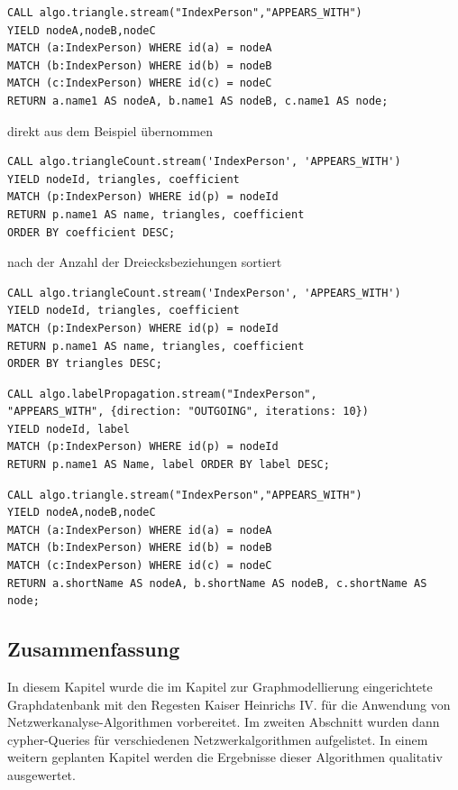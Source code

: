 \begin{verbatim}
CALL algo.triangle.stream("IndexPerson","APPEARS_WITH")
YIELD nodeA,nodeB,nodeC
MATCH (a:IndexPerson) WHERE id(a) = nodeA
MATCH (b:IndexPerson) WHERE id(b) = nodeB
MATCH (c:IndexPerson) WHERE id(c) = nodeC
RETURN a.name1 AS nodeA, b.name1 AS nodeB, c.name1 AS node;
\end{verbatim}

direkt aus dem Beispiel übernommen

\begin{verbatim}
CALL algo.triangleCount.stream('IndexPerson', 'APPEARS_WITH')
YIELD nodeId, triangles, coefficient
MATCH (p:IndexPerson) WHERE id(p) = nodeId
RETURN p.name1 AS name, triangles, coefficient
ORDER BY coefficient DESC;
\end{verbatim}

nach der Anzahl der Dreiecksbeziehungen sortiert

\begin{verbatim}
CALL algo.triangleCount.stream('IndexPerson', 'APPEARS_WITH')
YIELD nodeId, triangles, coefficient
MATCH (p:IndexPerson) WHERE id(p) = nodeId
RETURN p.name1 AS name, triangles, coefficient
ORDER BY triangles DESC;
\end{verbatim}

\begin{verbatim}
CALL algo.labelPropagation.stream("IndexPerson",
"APPEARS_WITH", {direction: "OUTGOING", iterations: 10})
YIELD nodeId, label
MATCH (p:IndexPerson) WHERE id(p) = nodeId
RETURN p.name1 AS Name, label ORDER BY label DESC;
\end{verbatim}

\begin{verbatim}
CALL algo.triangle.stream("IndexPerson","APPEARS_WITH")
YIELD nodeA,nodeB,nodeC
MATCH (a:IndexPerson) WHERE id(a) = nodeA
MATCH (b:IndexPerson) WHERE id(b) = nodeB
MATCH (c:IndexPerson) WHERE id(c) = nodeC
RETURN a.shortName AS nodeA, b.shortName AS nodeB, c.shortName AS node;
\end{verbatim}

\hypertarget{zusammenfassung-8}{%
\subsection{Zusammenfassung}\label{zusammenfassung-8}}

In diesem Kapitel wurde die im Kapitel zur Graphmodellierung
eingerichtete Graphdatenbank mit den Regesten Kaiser Heinrichs IV. für
die Anwendung von Netzwerkanalyse-Algorithmen vorbereitet. Im zweiten
Abschnitt wurden dann cypher-Queries für verschiedenen
Netzwerkalgorithmen aufgelistet. In einem weitern geplanten Kapitel
werden die Ergebnisse dieser Algorithmen qualitativ ausgewertet.

